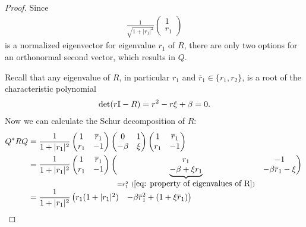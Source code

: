 \begin{proof}
	Since
	\begin{align*}
		\frac{1}{\sqrt{1+|r_1|^2}} \begin{pmatrix}
			1 \\
			r_1
		\end{pmatrix}
	\end{align*}
	is a normalized eigenvector for eigenvalue \(r_1\) of \(R\), there are
	only two options for an orthonormal second vector, which results in \(Q\).

	Recall that any eigenvalue of \(R\), in particular \(r_1\) and
	\(\overline{r}_1\in\{r_1, r_2\}\), is a root of the characteristic polynomial
	\begin{align}\label{eq: property of eigenvalues of R}
		\det (r\mathbb{I} - R) = r^2 - r\xi + \beta = 0.
	\end{align}
	Now we can calculate the Schur decomposition of \(R\):
	\begin{align*}
		Q^* R Q
		&= \frac{1}{1+|r_1|^2} \begin{pmatrix}
			1 & \overline{r}_1 \\
			r_{1} & -1
		\end{pmatrix}
		\begin{pmatrix}
			0 & 1 \\
			-\momCoeff & \xi
		\end{pmatrix}
		\begin{pmatrix}
			1 & \overline{r}_1 \\
			r_1 & -1
		\end{pmatrix}\\
		&= \frac{1}{1+|r_{1}|^2} \begin{pmatrix}
			1 & \overline{r}_1 \\
			r_1 & -1
		\end{pmatrix}
		\begin{pmatrix}
			r_1 & -1 \\
			\smash{\underbrace{-\momCoeff + \xi r_1}_{
				=r_1^2 \ (\ref{eq: property of eigenvalues of R})
			}}
			& -\momCoeff \overline{r}_1 - \xi
		\end{pmatrix}
		\vphantom{\underbrace{\begin{pmatrix}1\\1\end{pmatrix}}_{=2}}
		\\
		&=\frac{1}{1+|r_{1}|^2}\begin{pmatrix}
			r_1(1+|r_1|^2)
			& -\momCoeff \overline{r}_1^2  + (1+\xi \overline{r}_1) \\

\end{pmatrix}
\end{align*}
\end{proof}
